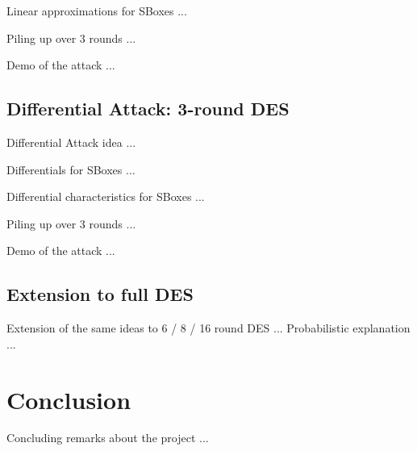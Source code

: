 \documentclass[9pt]{beamer}
\begin{document}
\begin{frame}
Linear approximations for SBoxes ...

\end{frame}

\begin{frame}
Piling up over 3 rounds ...

\end{frame}

\begin{frame}
Demo of the attack ...

\end{frame}

\subsection{Differential Attack: 3-round DES}
\begin{frame}
Differential Attack idea ... 

\end{frame}

\begin{frame}
Differentials for SBoxes ...

\end{frame}

\begin{frame}
Differential characteristics for SBoxes ...

\end{frame}

\begin{frame}
Piling up over 3 rounds ...

\end{frame}

\begin{frame}
Demo of the attack ...

\end{frame}

\subsection{Extension to full DES}
\begin{frame}
Extension of the same ideas to 6 / 8 / 16 round DES ... Probabilistic explanation ...

\end{frame}


\section{Conclusion}
\begin{frame}
Concluding remarks about the project ...

\end{frame}
\end{document}
